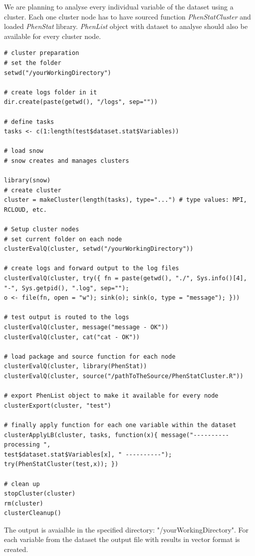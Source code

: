 \documentclass[12pt,a4paper]{article}
\begin{document}
We are planning to analyse every individual variable of the dataset using a cluster. Each one cluster node has to have sourced function \textit{PhenStatCluster} and loaded \textit{PhenStat} library. 
\textit{PhenList} object with dataset to analyse should also be available for every cluster node.
\begingroup
\fontsize{8pt}{12pt}\selectfont
\begin{verbatim}
# cluster preparation
# set the folder
setwd("/yourWorkingDirectory")

# create logs folder in it
dir.create(paste(getwd(), "/logs", sep=""))

# define tasks
tasks <- c(1:length(test$dataset.stat$Variables))

# load snow
# snow creates and manages clusters

library(snow)
# create cluster
cluster = makeCluster(length(tasks), type="...") # type values: MPI, RCLOUD, etc.

# Setup cluster nodes
# set current folder on each node
clusterEvalQ(cluster, setwd("/yourWorkingDirectory"))

# create logs and forward output to the log files
clusterEvalQ(cluster, try({ fn = paste(getwd(), "./", Sys.info()[4], "-", Sys.getpid(), ".log", sep=""); 
o <- file(fn, open = "w"); sink(o); sink(o, type = "message"); }))

# test output is routed to the logs
clusterEvalQ(cluster, message("message - OK"))
clusterEvalQ(cluster, cat("cat - OK"))

# load package and source function for each node
clusterEvalQ(cluster, library(PhenStat))
clusterEvalQ(cluster, source("/pathToTheSource/PhenStatCluster.R"))

# export PhenList object to make it available for every node
clusterExport(cluster, "test") 

# finally apply function for each one variable within the dataset
clusterApplyLB(cluster, tasks, function(x){ message("---------- processing ", 
test$dataset.stat$Variables[x], " ----------"); try(PhenStatCluster(test,x)); })

# clean up
stopCluster(cluster)
rm(cluster)
clusterCleanup()
\end{verbatim}
\endgroup

The output is avaialble in the specified directory: 
"/yourWorkingDirectory". 
For each variable from the dataset the output file with results in vector format is created.
\end{document}

